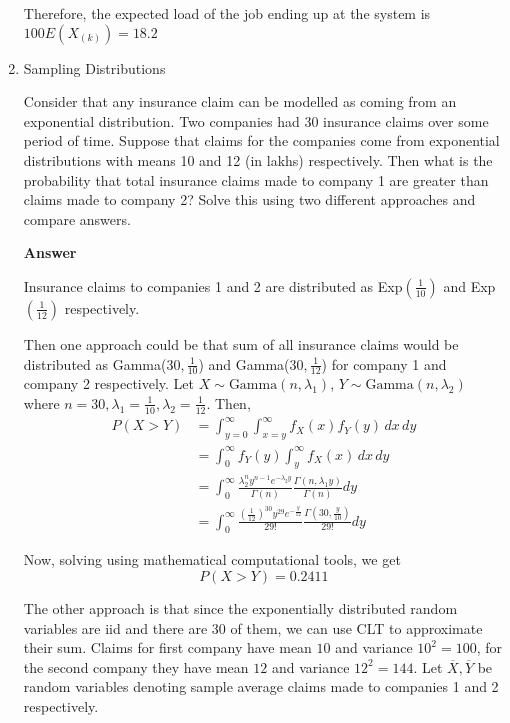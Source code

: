 \documentclass[12pt, oneside]{article}
\begin{document}
\begin{enumerate}
{  Therefore, the expected load of the job ending up at the  system is \(100E(X_{(k)}) = 18.2\)
}



\item	{
  Sampling Distributions 

  Consider that any insurance claim can be modelled as coming from an exponential distribution.
  Two companies had 30 insurance claims over some period of time. Suppose that claims for the
  companies come from exponential distributions with means 10 and 12 (in lakhs) respectively.
  Then what is the probability that total insurance claims made to company 1 are greater than
  claims made to company 2? Solve this using two different approaches and compare answers.

  \textbf{Answer}

  Insurance claims to companies 1 and 2 are distributed as Exp\((\frac{1}{10})\) and 
  Exp\((\frac{1}{12})\) respectively.

  Then one approach could be that sum of all insurance claims would be distributed as
  Gamma(\(30, \frac{1}{10}\)) and Gamma(\(30, \frac{1}{12}\)) for company 1 and company 2
  respectively. Let \(X \sim \text{Gamma}(n, \lambda_1)\), \(Y \sim \text{Gamma}(n, \lambda_2)\)
  where \(n = 30, \lambda_1 = \frac{1}{10}, \lambda_2 = \frac{1}{12}\). Then,
  \begin{align*}
    P(X > Y) &= \int_{y=0}^{\infty} \int_{x=y}^{\infty} f_X(x) f_Y(y) \,dx \,dy \\
      &= \int_{0}^{\infty} f_Y(y) \int_{y}^{\infty} f_X(x) \,dx \,dy \\
      &= \int_{0}^\infty \frac{\lambda_2^n y^{n-1} e^{-\lambda_2 y}}{\Gamma(n)} \frac{\Gamma(n, \lambda_1 y)}{\Gamma(n)} dy \tag*{(where \(\Gamma(\cdot, \cdot)\) is the upper incomplete Gamma function)} \\
      &= \int_{0}^\infty \frac{\left(\frac{1}{12}\right)^{30} y^{29} e^{-\frac{y}{12}}}{29!} \frac{\Gamma(30, \frac{y}{10})}{29!} dy
  \end{align*}

  Now, solving using mathematical computational tools, we get
  \begin{equation}
    P(X > Y) = 0.2411 \label{eq:1}
  \end{equation}

  The other approach is that since the exponentially distributed random variables are
  iid and there are 30 of them, we can use CLT to approximate their sum. Claims for
  first company have mean \(10\) and variance \(10^2 = 100\), for the second company
  they have mean \(12\) and variance \(12^2 = 144\). Let \(\overline{X}, \overline{Y}\) be random variables
  denoting sample average claims made to companies 1 and 2 respectively.

}
\end{enumerate}
\end{document}
